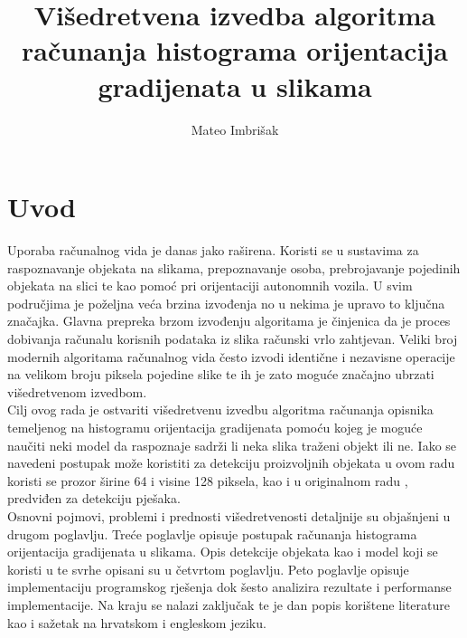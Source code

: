 \documentclass[times, utf8, zavrsni]{fer}
\begin{document}

\title{Višedretvena izvedba algoritma računanja histograma orijentacija gradijenata u slikama}

\author{Mateo Imbrišak}

\maketitle

\zahvala{}

\tableofcontents

\chapter{Uvod}
Uporaba računalnog vida je danas jako raširena. Koristi se u sustavima za raspoznavanje objekata na slikama, prepoznavanje osoba, prebrojavanje pojedinih objekata na slici te kao pomoć pri orijentaciji autonomnih vozila. U svim područjima je poželjna veća brzina izvođenja no u nekima je upravo to ključna značajka. Glavna prepreka brzom izvođenju algoritama je činjenica da je proces dobivanja računalu korisnih podataka iz slika računski vrlo zahtjevan. Veliki broj modernih algoritama računalnog vida često izvodi identične i nezavisne operacije na velikom broju piksela pojedine slike te ih je zato moguće značajno ubrzati višedretvenom izvedbom. \\

Cilj ovog rada je ostvariti višedretvenu izvedbu algoritma računanja opisnika temeljenog na histogramu orijentacija gradijenata pomoću kojeg je moguće naučiti neki model da raspoznaje sadrži li neka slika traženi objekt ili ne. Iako se navedeni postupak može koristiti za detekciju proizvoljnih objekata u ovom radu koristi se prozor širine 64 i visine 128 piksela, kao i u originalnom radu \citep{dalal2005histograms}, predviđen za detekciju pješaka. \\

Osnovni pojmovi, problemi i prednosti višedretvenosti detaljnije su objašnjeni u drugom poglavlju. Treće poglavlje opisuje postupak računanja histograma orijentacija gradijenata u slikama. Opis detekcije objekata kao i model koji se koristi u te svrhe opisani su u četvrtom poglavlju. Peto poglavlje opisuje implementaciju programskog rješenja dok šesto analizira rezultate i performanse implementacije. Na kraju se nalazi zaključak te je dan popis korištene literature kao i sažetak na hrvatskom i engleskom jeziku.
\end{document}

